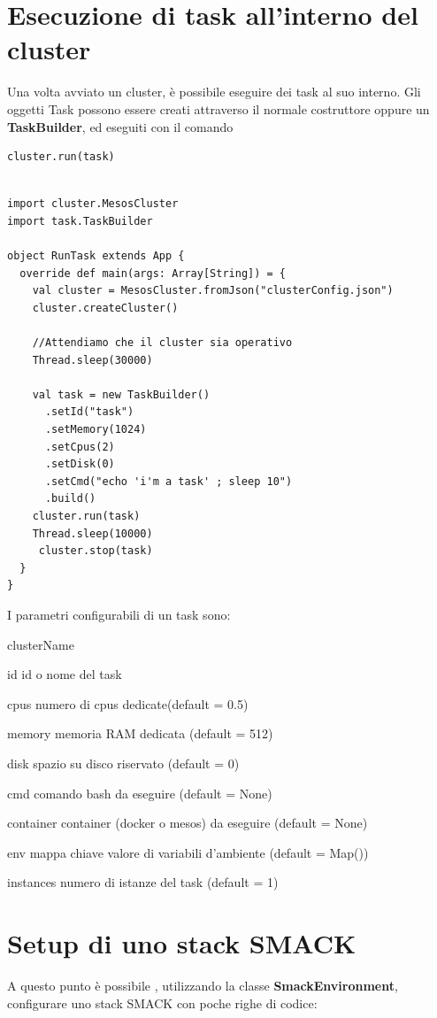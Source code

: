 \documentclass[12pt,a4paper]{article}
\begin{document}
\section{Esecuzione di task all'interno del cluster}\label{sec:esecuzioneTask}
Una volta avviato un cluster, \`e possibile eseguire dei task al suo interno.
Gli oggetti Task possono essere creati attraverso il normale costruttore oppure un \textbf{TaskBuilder}, ed eseguiti con il comando
\begin{lstlisting}[style=myScalastyle]
cluster.run(task) 
\end{lstlisting}
\begin{lstlisting}[style=myScalastyle]

import cluster.MesosCluster
import task.TaskBuilder

object RunTask extends App {
  override def main(args: Array[String]) = {
    val cluster = MesosCluster.fromJson("clusterConfig.json")
    cluster.createCluster()
    
    //Attendiamo che il cluster sia operativo
    Thread.sleep(30000) 
    
    val task = new TaskBuilder()
      .setId("task")
      .setMemory(1024)
      .setCpus(2)
      .setDisk(0)
      .setCmd("echo 'i'm a task' ; sleep 10")
      .build()
    cluster.run(task)
    Thread.sleep(10000)
	 cluster.stop(task)	
  }
}
\end{lstlisting}
I parametri configurabili di un task sono:
\begin{labeling}{clusterName}
	\item[id]
		id o nome del task
	\item [cpus] 
		numero di cpus dedicate(default = 0.5)
	\item [memory] 
		memoria RAM dedicata (default = 512)
	\item [disk] 
		spazio su disco riservato (default = 0)
	\item [cmd]
		comando bash da eseguire (default = None)
	\item [container]
		container (docker o mesos) da eseguire (default = None)
	\item [env]
		mappa chiave valore di variabili d'ambiente (default = Map())
	\item [instances]
		numero di istanze del task (default = 1)
\end{labeling}

\section{Setup di uno stack SMACK}\label{sec:setupSmack}
A questo punto \`e possibile , utilizzando la classe \textbf{SmackEnvironment}, configurare uno stack SMACK con poche righe di codice:
\end{document}
